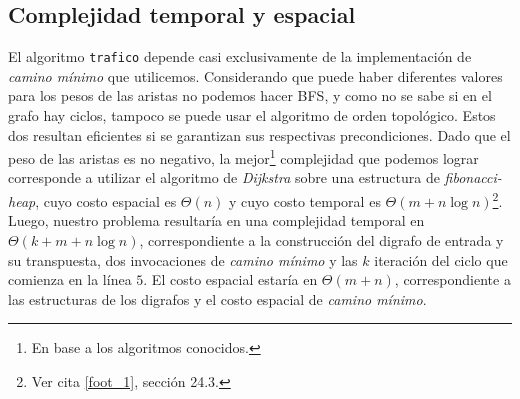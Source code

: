 \subsection{Complejidad temporal y espacial}

El algoritmo \texttt{trafico} depende casi exclusivamente de la implementación de \textit{camino mínimo} que utilicemos. Considerando que puede haber diferentes valores para los pesos de las aristas no podemos hacer BFS, y como no se sabe si en el grafo hay ciclos, tampoco se puede usar el algoritmo de orden topológico. Estos dos resultan eficientes si se garantizan sus respectivas precondiciones. Dado que el peso de las aristas es no negativo, la mejor\footnote{ En base a los algoritmos conocidos.} complejidad que podemos lograr corresponde a utilizar el algoritmo de \textit{Dijkstra} sobre una estructura de \textit{fibonacci-heap}, cuyo costo espacial es $\Theta(n)$ y cuyo costo temporal es $\Theta(m + n\log n)$\footnote{Ver cita \ref{foot_1}, sección 24.3.}. Luego, nuestro problema resultaría en una complejidad temporal en $\Theta(k + m + n\log n)$, correspondiente a la construcción del digrafo de entrada y su transpuesta, dos invocaciones de \textit{camino mínimo} y las $k$ iteración del ciclo que comienza en la línea $5$. El costo espacial estaría en $\Theta(m + n)$, correspondiente a las estructuras de los digrafos y el costo espacial de \textit{camino mínimo}. 
